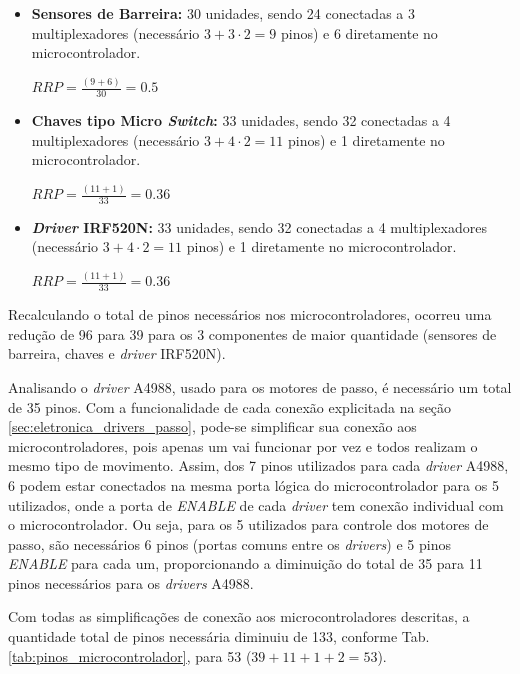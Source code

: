     \begin{itemize}
        \item \textbf{Sensores de Barreira:} 30 unidades, sendo 24 conectadas a 3 multiplexadores (necessário $3 + 3\cdot2 = 9$ pinos) e 6 diretamente no microcontrolador. 
        
        $RRP = \frac{(9 + 6)}{30} = 0.5$
        
        \item \textbf{Chaves tipo Micro \textit{Switch}:} 33 unidades, sendo 32 conectadas a 4 multiplexadores (necessário $3 + 4\cdot2 = 11$ pinos) e 1 diretamente no microcontrolador. 
        
        $RRP = \frac{(11 + 1)}{33} = 0.36$
        
        \item \textbf{\textit{Driver} IRF520N:} 33 unidades, sendo 32 conectadas a 4 multiplexadores (necessário $3 + 4\cdot2 = 11$ pinos) e 1 diretamente no microcontrolador. 
        
        $RRP = \frac{(11 + 1)}{33} = 0.36$
        
    \end{itemize}
    
    Recalculando o total de pinos necessários nos microcontroladores, ocorreu uma redução de 96 para 39 para os 3 componentes de maior quantidade (sensores de barreira, chaves e \textit{driver} IRF520N). 
    
    Analisando o \textit{driver} A4988, usado para os motores de passo, é necessário um total de 35 pinos. Com a funcionalidade de cada conexão explicitada na seção \ref{sec:eletronica_drivers_passo}, pode-se simplificar sua conexão aos microcontroladores, pois apenas um vai funcionar por vez e todos realizam o mesmo tipo de movimento. Assim, dos 7 pinos utilizados para cada \textit{driver} A4988, 6 podem estar conectados na mesma porta lógica do microcontrolador para os 5 utilizados, onde a porta de \textit{ENABLE} de cada \textit{driver} tem conexão individual com o microcontrolador. Ou seja, para os 5 utilizados para controle dos motores de passo, são necessários 6 pinos (portas comuns entre os \textit{drivers}) e 5 pinos \textit{ENABLE} para cada um, proporcionando a diminuição do total de 35 para 11 pinos necessários para os \textit{drivers} A4988.
    
    Com todas as simplificações de conexão aos microcontroladores descritas, a quantidade total de pinos necessária diminuiu de 133, conforme Tab. \ref{tab:pinos_microcontrolador}, para 53 ($39 + 11 + 1 + 2 = 53$).
    
